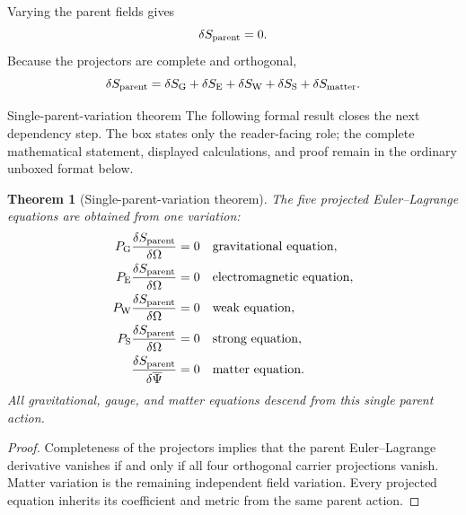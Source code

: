 \documentclass[11pt]{article}
\numberwithin{equation}{section}
\newtheorem{theorem}[definition]{Theorem}
\theoremstyle{remark}
\newcommand{\Pg}{P_{\mathrm G}}
\newcommand{\Pe}{P_{\mathrm E}}
\newcommand{\Pw}{P_{\mathrm W}}
\newcommand{\Ps}{P_{\mathrm S}}
\begin{document}
Varying the parent fields gives
\begin{equation}
\delta S_{\rm parent}=0.
\end{equation}
Because the projectors are complete and orthogonal,
\begin{equation}
\delta S_{\rm parent}
=\delta S_{\rm G}+\delta S_{\rm E}+\delta S_{\rm W}+\delta S_{\rm S}+\delta S_{\rm matter}.
\end{equation}

\begin{proofguide}{Single-parent-variation theorem}
The following formal result closes the next dependency step. The box states only the reader-facing role; the complete mathematical statement, displayed calculations, and proof remain in the ordinary unboxed format below.
\end{proofguide}
\begin{theorem}[Single-parent-variation theorem]
The five projected Euler--Lagrange equations are obtained from one variation:
\begin{align}
\Pg\frac{\delta S_{\rm parent}}{\delta\Omega}&=0&&\text{gravitational equation},\\
\Pe\frac{\delta S_{\rm parent}}{\delta\Omega}&=0&&\text{electromagnetic equation},\\
\Pw\frac{\delta S_{\rm parent}}{\delta\Omega}&=0&&\text{weak equation},\\
\Ps\frac{\delta S_{\rm parent}}{\delta\Omega}&=0&&\text{strong equation},\\
\frac{\delta S_{\rm parent}}{\delta\overline\Psi}&=0&&\text{matter equation}.
\end{align}
All gravitational, gauge, and matter equations descend from this single parent action.
\end{theorem}

\begin{proof}
Completeness of the projectors implies that the parent Euler--Lagrange derivative vanishes if and only if all four orthogonal carrier projections vanish. Matter variation is the remaining independent field variation. Every projected equation inherits its coefficient and metric from the same parent action.
\end{proof}
\end{document}
